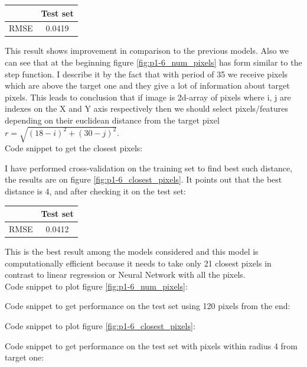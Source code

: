 \documentclass{article}
\begin{document}
			\begin{center}
				\begin{tabular}{| c | c | }
					\hline
					\, &  Test set \\ \hline
					RMSE & 0.0419 \\ 
					\hline
				\end{tabular}
			\end{center}
			
			This result shows improvement in comparison to the previous models. Also we can see that at the beginning figure \ref{fig:p1-6_num_pixels} has form similar to the step function. I describe it by the fact that with period of 35 we receive pixels which are above the target one and they give a lot of information about target pixels. This leads to conclusion that if image is 2d-array of pixels where i, j are indexes on the X and Y axis respectively then we should select pixels/features depending on their euclidean distance from the target pixel $r = \sqrt{(18 - i)^2 + (30 - j)^2}$. \\
			Code snippet to get the closest pixels:
			
			
			 I have performed cross-validation on the training set to find best such distance, the results are on figure \ref{fig:p1-6_closest_pixels}. It points out that the best distance is 4, and after checking it on the test set:
			\begin{center}
				\begin{tabular}{| c | c |}
					\hline
					\, &  Test set \\ \hline
					RMSE & 0.0412 \\ 
					\hline
				\end{tabular}
			\end{center}
			This is the best result among the models considered and this model is computationally efficient because it needs to take only 21 closest pixels in contrast to linear regression or Neural Network with all the pixels. \\ 
			Code snippet to plot figure \ref{fig:p1-6_num_pixels}:
			
			Code snippet to get performance on the test set using 120 pixels from the end:
			
			Code snippet to plot figure \ref{fig:p1-6_closest_pixels}:
			
			Code snippet to get performance on the test set with pixels within radius 4 from target one:
			
			\newpage
			
\end{document}
